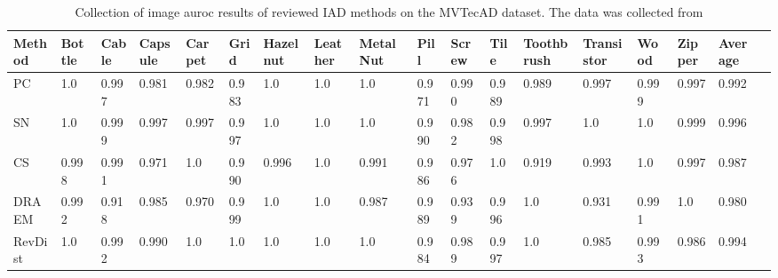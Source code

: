 \begin{table}[htbp]
    \tiny
    \centering
    \begin{tabularx}{\textwidth}{|X|X|X|X|X|X|X|X|X|X|X|X|X|X|X|X|X|X|}%
        \hline
        \textbf{Method} & \textbf{Bottle} & \textbf{Cable} & \textbf{Capsule} & \textbf{Carpet} & \textbf{Grid} & \textbf{Hazelnut} & \textbf{Leather} & \textbf{Metal Nut} & \textbf{Pill} & \textbf{Screw} & \textbf{Tile} & \textbf{Toothbrush} & \textbf{Transistor} & \textbf{Wood} & \textbf{Zipper} & \textbf{Average} \\
        \hline
        PC \cite{patchCore2022} & 1.0 & 0.997 & 0.981 & 0.982 & 0.983 & 1.0 & 1.0 & 1.0 & 0.971 & 0.990 & 0.989 & 0.989 & 0.997 & 0.999 & 0.997 & 0.992 \\
        \hline
        SN \cite{liu2023simplenet} & 1.0 & 0.999 & 0.997 & 0.997 & 0.997 & 1.0 & 1.0 & 1.0 & 0.990 & 0.982 & 0.998 & 0.997 & 1.0 & 1.0 & 0.999 & 0.996 \\
        \hline
        CS \cite{csflow2022} & 0.998 & 0.991 & 0.971 & 1.0 & 0.990 & 0.996 & 1.0 & 0.991 & 0.986 & 0.976 & 1.0 & 0.919 & 0.993 & 1.0 & 0.997 & 0.987 \\
        \hline
        DRAEM \cite{Zavrtanik_2021DRAEM} & 0.992 & 0.918 & 0.985 & 0.970 & 0.999 & 1.0 & 1.0 & 0.987 & 0.989 & 0.939 & 0.996 & 1.0 & 0.931 & 0.991 & 1.0 & 0.980 \\
        \hline
        RevDist \cite{revdist2023} & 1.0 & 0.992 & 0.990 & 1.0 & 1.0 & 1.0 & 1.0 & 1.0 & 0.984 & 0.989 & 0.997 & 1.0 & 0.985 & 0.993 & 0.986 & 0.994 \\
        \hline
    \end{tabularx}
    \caption{Collection of image auroc results of reviewed IAD methods on the MVTecAD \cite{MVTEC_Bergmann_2021} dataset. The data was collected from \cite{liu2024deep} \cite{liu2023simplenet} \cite{csflow2022} \cite{Zavrtanik_2021DRAEM} \cite{revdist2023}}
    \label{tab:imageaurocmvtec}
\end{table}

